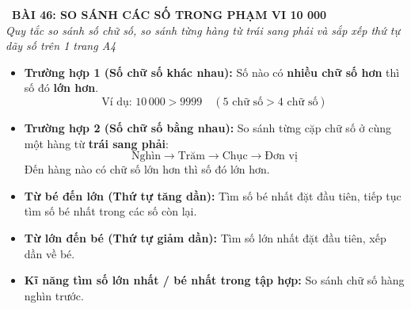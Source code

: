 \documentclass[11pt,a4paper]{article}
\begin{document}
\begin{tcolorbox}[
  enhanced,
  colback=white,
  colframe=primary,
  arc=3mm,
  boxrule=1.2pt,
  left=4mm, right=4mm, top=2.5mm, bottom=2.5mm,
  drop shadow=black!10!white
]
  \centering
  {\Large\bfseries\color{primary}\faBookmark\ BÀI 46: SO SÁNH CÁC SỐ TRONG PHẠM VI 10 000}\\[1.5mm]
  {\small\itshape\color{black!75}Quy tắc so sánh số chữ số, so sánh từng hàng từ trái sang phải và sắp xếp thứ tự dãy số trên 1 trang A4}
\end{tcolorbox}

\vspace{-2mm}


\noindent
\begin{minipage}[t]{0.49\textwidth}\vspace{0pt}
\begin{tcolorbox}[
  enhanced,
  colback=blue!4!white,
  colframe=blue!75!black,
  arc=2mm, boxrule=0.8pt,
  left=2mm, right=2mm, top=1.8mm, bottom=1.8mm,
  title={\footnotesize\bfseries\color{white}\faKey\ 1. Hai quy tắc so sánh bất biến}
]
{\footnotesize
\begin{itemize}\setlength{\itemsep}{1.5pt}\setlength{\leftskip}{-2.5mm}
  \item \textbf{Trường hợp 1 (Số chữ số khác nhau):}
  Số nào có \textbf{nhiều chữ số hơn} thì số đó \textbf{lớn hơn}.
  $$\text{Ví dụ: } 10\,000 > 9999 \quad (5 \text{ chữ số} > 4 \text{ chữ số})$$
  \item \textbf{Trường hợp 2 (Số chữ số bằng nhau):}
  So sánh từng cặp chữ số ở cùng một hàng từ \textbf{trái sang phải}:
  $$\text{Nghìn} \to \text{Trăm} \to \text{Chục} \to \text{Đơn vị}$$
  Đến hàng nào có chữ số lớn hơn thì số đó lớn hơn.
\end{itemize}
}
\end{tcolorbox}
\end{minipage}
\hfill
\begin{minipage}[t]{0.49\textwidth}\vspace{0pt}
\begin{tcolorbox}[
  enhanced,
  colback=teal!4!white,
  colframe=teal!75!black,
  arc=2mm, boxrule=0.8pt,
  left=2mm, right=2mm, top=1.8mm, bottom=1.8mm,
  title={\footnotesize\bfseries\color{white}\faSliders\ 2. Kĩ năng sắp xếp thứ tự dãy số}
]
{\footnotesize
\begin{itemize}\setlength{\itemsep}{1.5pt}\setlength{\leftskip}{-2.5mm}
  \item \textbf{Từ bé đến lớn (Thứ tự tăng dần):}
  Tìm số bé nhất đặt đầu tiên, tiếp tục tìm số bé nhất trong các số còn lại.
  \item \textbf{Từ lớn đến bé (Thứ tự giảm dần):}
  Tìm số lớn nhất đặt đầu tiên, xếp dần về bé.
  \item \textbf{Kĩ năng tìm số lớn nhất / bé nhất trong tập hợp:} So sánh chữ số hàng nghìn trước.
\end{itemize}
}
\end{tcolorbox}
\end{minipage}
\end{document}
